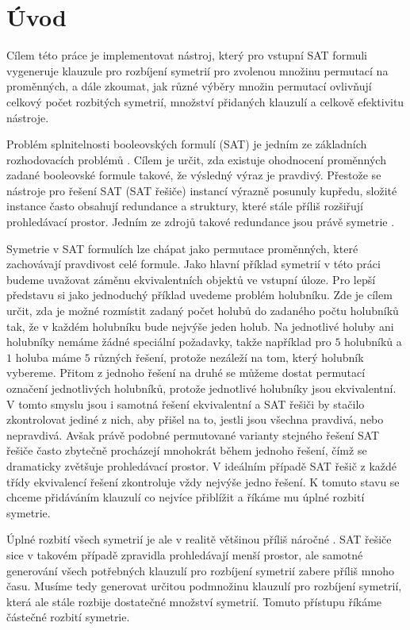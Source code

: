\chapter*{Úvod}

Cílem této práce je implementovat nástroj, který pro vstupní SAT formuli vygeneruje klauzule pro rozbíjení symetrií pro zvolenou množinu permutací na proměnných, a dále zkoumat, jak různé výběry množin permutací ovlivňují celkový počet rozbitých symetrií, množství přidaných klauzulí a celkově efektivitu nástroje.

Problém splnitelnosti booleovských formulí (SAT) je jedním ze základních rozhodovacích problémů \cite{BiereHeuleVanDerMaar2021}. Cílem je určit, zda existuje ohodnocení proměnných zadané booleovské formule takové, že výsledný výraz je pravdivý. Přestože se nástroje pro řešení SAT (SAT řešiče) instancí výrazně posunuly kupředu, složité instance často obsahují redundance a struktury, které stále příliš rozšiřují prohledávací prostor. Jedním ze zdrojů takové redundance jsou právě symetrie  \cite{DBLP:reference/fai/GentPP06}\cite{article}.

Symetrie v SAT formulích lze chápat jako permutace proměnných, které zachovávají pravdivost celé formule. Jako hlavní příklad symetrií v této práci budeme uvažovat záměnu ekvivalentních objektů ve vstupní úloze. Pro lepší představu si jako jednoduchý příklad uvedeme problém holubníku. Zde je cílem určit, zda je možné rozmístit zadaný počet holubů do zadaného počtu holubníků tak, že v každém holubníku bude nejvýše jeden holub. Na jednotlivé holuby ani holubníky nemáme žádné speciální požadavky, takže například pro $5$ holubníků a $1$ holuba máme $5$ různých řešení, protože nezáleží na tom, který holubník vybereme. Přitom z jednoho řešení na druhé se můžeme dostat permutací označení jednotlivých holubníků, protože jednotlivé holubníky jsou ekvivalentní. V tomto smyslu jsou i samotná řešení ekvivalentní a SAT řešiči by stačilo zkontrolovat jediné z nich, aby přišel na to, jestli jsou všechna pravdivá, nebo nepravdivá. Avšak právě podobné permutované varianty stejného řešení SAT řešiče často zbytečně procházejí mnohokrát během jednoho řešení, čímž se dramaticky zvětšuje prohledávací prostor. V ideálním případě SAT řešič z každé třídy ekvivalencí řešení zkontroluje vždy nejvýše jedno řešení. K tomuto stavu se chceme přidáváním klauzulí co nejvíce přiblížit a říkáme mu úplné rozbití symetrie.

Úplné rozbití všech symetrií je ale v realitě většinou příliš náročné \cite{DBLP:reference/fai/GentPP06}. SAT řešiče sice v takovém případě zpravidla prohledávají menší prostor, ale samotné generování všech potřebných klauzulí pro rozbíjení symetrií zabere příliš mnoho času. Musíme tedy generovat určitou podmnožinu klauzulí pro rozbíjení symetrií, která ale stále rozbije dostatečné množství symetrií. Tomuto přístupu říkáme částečné rozbití symetrie. 

